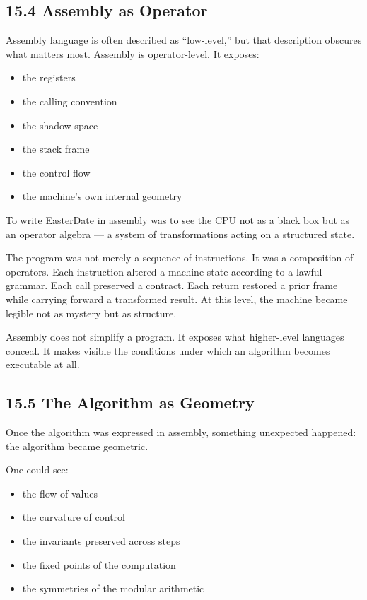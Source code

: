 \documentclass[
]{article}
\providecommand{\tightlist}{%
  \setlength{\itemsep}{0pt}\setlength{\parskip}{0pt}}
\begin{document}
\hypertarget{assembly-as-operator}{%
\subsection{15.4 Assembly as Operator}\label{assembly-as-operator}}

Assembly language is often described as ``low-level,'' but that
description obscures what matters most. Assembly is operator-level. It
exposes:

\begin{itemize}
\tightlist
\item
  the registers
\item
  the calling convention
\item
  the shadow space
\item
  the stack frame
\item
  the control flow
\item
  the machine's own internal geometry
\end{itemize}

To write EasterDate in assembly was to see the CPU not as a black box
but as an operator algebra --- a system of transformations acting on a
structured state.

The program was not merely a sequence of instructions. It was a
composition of operators. Each instruction altered a machine state
according to a lawful grammar. Each call preserved a contract. Each
return restored a prior frame while carrying forward a transformed
result. At this level, the machine became legible not as mystery but as
structure.

Assembly does not simplify a program. It exposes what higher-level
languages conceal. It makes visible the conditions under which an
algorithm becomes executable at all.

\hypertarget{the-algorithm-as-geometry}{%
\subsection{15.5 The Algorithm as
Geometry}\label{the-algorithm-as-geometry}}

Once the algorithm was expressed in assembly, something unexpected
happened: the algorithm became geometric.

One could see:

\begin{itemize}
\tightlist
\item
  the flow of values
\item
  the curvature of control
\item
  the invariants preserved across steps
\item
  the fixed points of the computation
\item
  the symmetries of the modular arithmetic
\end{itemize}
\end{document}
